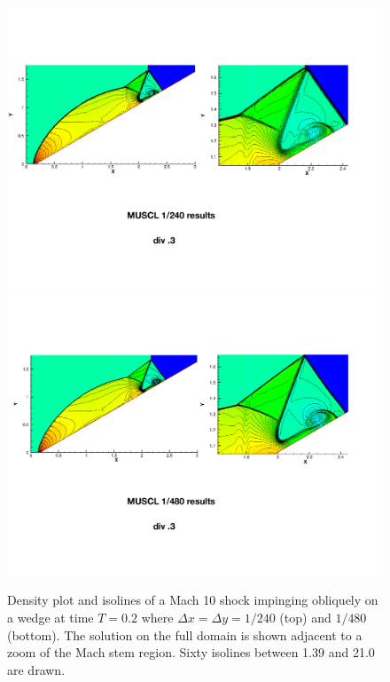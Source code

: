 \begin{figure}[H]
\centering
\hspace*{-.2in}
\includegraphics[width=1. \linewidth]{figs/doubleMach240.pdf}
\hspace*{-.2in}
\includegraphics[width=1. \linewidth]{figs/doubleMach480.pdf}
\caption{\sf Density plot and isolines of a Mach 10 shock impinging 
obliquely on a wedge at time $T = 0.2$ where $\Delta x = \Delta y =
1/240$ (top) and $1/480$ (bottom).
The solution on the full domain is shown adjacent to a zoom of the Mach 
stem region.  Sixty isolines between 1.39 and 21.0 are drawn.}\label{fig:dm}
\end{figure}

